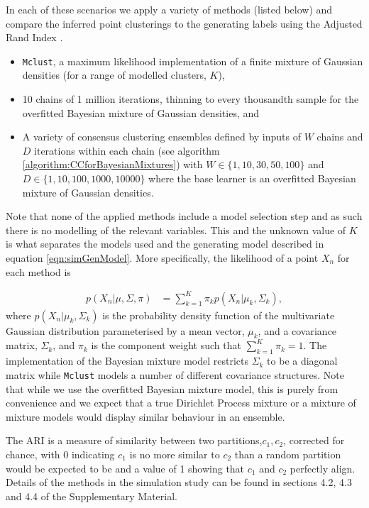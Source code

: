 \documentclass{bmcart}
\begin{document}
	\noindent In each of these scenarios we apply a variety of methods (listed below) and compare the inferred point clusterings to the generating labels using the Adjusted Rand Index \citep[\textbf{ARI},][]{hubert1985comparing}.
	\begin{itemize}
		\item \texttt{Mclust}, a maximum likelihood implementation of a finite mixture of Gaussian densities (for a range of modelled clusters, $K$),
		\item 10 chains of 1 million iterations, thinning to every thousandth sample for the overfitted Bayesian mixture of Gaussian densities, and
		\item A variety of consensus clustering ensembles defined by inputs of $W$ chains and $D$ iterations within each chain (see algorithm \ref{algorithm:CCforBayesianMixtures}) with $W \in \{1, 10, 30, 50, 100\}$ and $D \in \{1, 10, 100, 1000, 10000\}$ where the base learner is an overfitted Bayesian mixture of Gaussian densities.
	\end{itemize}
	Note that none of the applied methods include a model selection step and as such there is no modelling of the relevant variables. This and the unknown value of $K$ is what separates the models used and the generating model described in equation \ref{eqn:simGenModel}. More specifically, the likelihood of a point $X_n$ for each method is
	
	\begin{align} \label{eqn:mixtureModel}
		p(X_n | \mu, \Sigma, \pi) &= \sum_{k=1}^K \pi_k p(X_n | \mu_k, \Sigma_k),
	\end{align}
	where $p(X_n | \mu_k, \Sigma_k)$ is the probability density function of the multivariate Gaussian distribution parameterised by a mean vector, $\mu_k$, and a covariance matrix, $\Sigma_k$, and $\pi_k$ is the component weight such that $\sum_{k=1}^K\pi_k = 1$. The implementation of the Bayesian mixture model restricts $\Sigma_k$ to be a diagonal matrix while \texttt{Mclust} models a number of different covariance structures. Note that while we use the overfitted Bayesian mixture model, this is purely from convenience and we expect that a true Dirichlet Process mixture or a mixture of mixture models would display similar behaviour in an ensemble.
	
	The ARI is a measure of similarity between two partitions,$c_1, c_2$, corrected for chance, with 0 indicating $c_1$ is no more similar to $c_2$ than a random partition would be expected to be and a value of 1 showing that $c_1$ and $c_2$ perfectly align. Details of the methods in the simulation study can be found in sections 4.2, 4.3 and 4.4 of the Supplementary Material.
	
\end{document}
